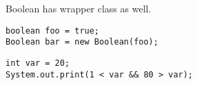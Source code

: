 \documentclass[en, 11pt, xcolor=dvipsnames]{beamer}
\begin{document}
\begin{frame}[fragile]


	\begin{columns}[c]
		\begin{column}{0.9\textwidth}

			Boolean has wrapper class as well.

			\begin{lstlisting}[style=Java]
boolean foo = true;
Boolean bar = new Boolean(foo);\end{lstlisting}

			\begin{lstlisting}[style=Java]
int var = 20;
System.out.print(1 < var && 80 > var);\end{lstlisting}

		\end{column}
	\end{columns}

\end{frame}
\end{document}
